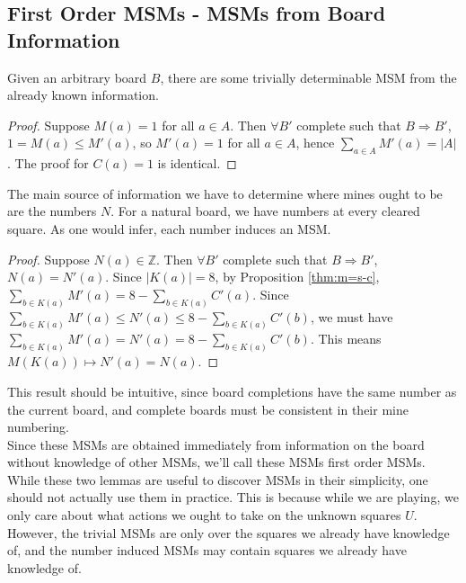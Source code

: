 \newpage
\subsection{First Order MSMs - MSMs from Board Information}

Given an arbitrary board $B$, there are some trivially determinable MSM from the already known information.

\begin{proof}
    Suppose $M(a)=1$ for all $a\in A$. Then $\forall B'$ complete such that $B\Rightarrow B'$, $1=M(a)\leq M'(a)$, so $M'(a)=1$ for all $a\in A$, hence $\sum_{a\in A}M'(a)=|A|$. The proof for $C(a)=1$ is identical.
\end{proof}

The main source of information we have to determine where mines ought to be are the numbers $N$. For a natural board, we have numbers at every cleared square. As one would infer, each number induces an MSM.

\begin{proof}
    Suppose $N(a)\in\mathbb{Z}$. Then $\forall B'$ complete such that $B\Rightarrow B'$, $N(a)=N'(a)$. Since $|K(a)|=8$, by Proposition \ref{thm:m=s-c}, $\sum_{b\in K(a)}M'(a)=8-\sum_{b\in K(a)}C'(a)$. Since $\sum_{b\in K(a)}M'(a)\leq N'(a)\leq 8-\sum_{b\in K(a)}C'(b)$, we must have $\sum_{b\in K(a)}M'(a)=N'(a)=8-\sum_{b\in K(a)}C'(b)$. This means $M(K(a))\mapsto N'(a)=N(a)$.
\end{proof}
This result should be intuitive, since board completions have the same number as the current board, and complete boards must be consistent in their mine numbering.\\

Since these MSMs are obtained immediately from information on the board without knowledge of other MSMs, we'll call these MSMs first order MSMs. While these two lemmas are useful to discover MSMs in their simplicity, one should not actually use them in practice. This is because while we are playing, we only care about what actions we ought to take on the unknown squares $U$. However, the trivial MSMs are only over the squares we already have knowledge of, and the number induced MSMs may contain squares we already have knowledge of.\\

